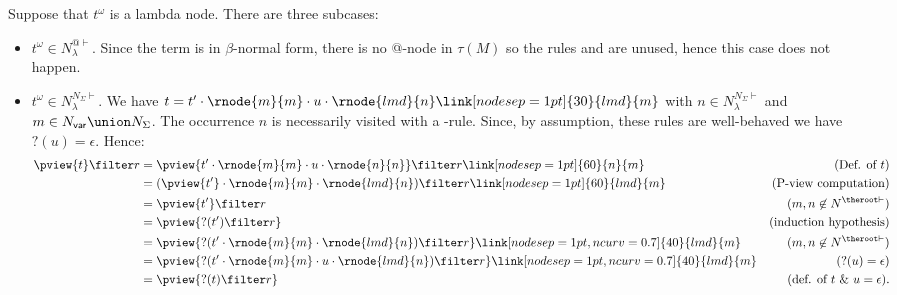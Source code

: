 Suppose that $t^\omega$ is a lambda node. There are three subcases:
\begin{itemize}
\item $t^\omega \in N^{@\vdash}_\lambda$. Since the term is in $\beta$-normal form, there is no
    @-node in $\tau(M)$ so the rules  and
     are unused, hence this case does not happen.

\item $t^\omega \in N^{N_\Sigma\vdash}_\lambda$. We have $t =  t' \cdot \rnode{m}{m} \cdot  u \cdot \rnode{lmd}{n}
    \link[nodesep=1pt]{30}{lmd}{m}$ with $n\in N^{N_\Sigma
    \vdash}_\lambda$ and $m \in N_{\sf var} \union N_\Sigma$.
    The occurrence $n$ is necessarily visited with a
    -rule. Since, by assumption, these rules
    are well-behaved we have $?(u) = \epsilon$. Hence:
        \begin{align*}
        \pview{t} \filter  r
        &= \pview{t' \cdot \rnode{m}{m} \cdot u \cdot \rnode{n}{n}} \filter  r
               \link[nodesep=1pt]{60}{n}{m}                   & (\mbox{Def. of $t$})\\
        &= (\pview{t'} \cdot \rnode{m}{m} \cdot \rnode{lmd}{n}) \filter  r
               \link[nodesep=1pt]{60}{lmd}{m}                 & (\mbox{P-view computation}) \\
        &= \pview{t'} \filter  r                & (m, n \not\in N^{\theroot \vdash}) \\
        &= \pview{?(t') \filter  r }               & \mbox{(induction hypothesis)} \\
        &= \pview{ ?(t' \cdot \rnode{m}{m} \cdot \rnode{lmd}{n}) \filter r }
\link[nodesep=1pt,ncurv=0.7]{40}{lmd}{m}                                                          & (m, n \not\in N^{\theroot \vdash}) \\
        &= \pview{ ?(t' \cdot \rnode{m}{m} \cdot u \cdot \rnode{lmd}{n}) \filter r }
\link[nodesep=1pt,ncurv=0.7]{40}{lmd}{m}                                                          & (?(u)=\epsilon) \\
        &= \pview{ ?(t) \filter r }                & \mbox{(def. of $t$ \& $u = \epsilon$).}
        \end{align*}


\end{itemize}
